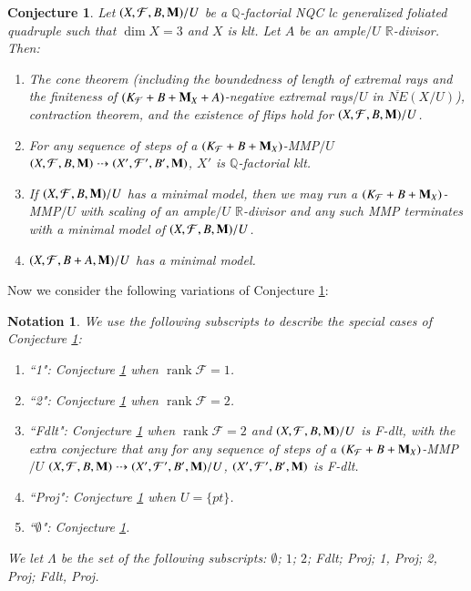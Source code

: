 \documentclass[preprint,12pt]{elsarticle}
\newcommand{\Mm}{{\bf{M}}}
\newcommand{\Qq}{\mathbb{Q}}
\newcommand{\Rr}{\mathbb{R}}
\newcommand{\rk}{\operatorname{rank}}
\newcommand{\Ff}{\mathcal{F}}
\newtheorem{conj}[thm]{Conjecture}
\newtheorem{nota}[thm]{Notation}
\begin{document}
\begin{conj}\label{conj: mmp gfq threefold}
    Let $(X,\Ff,B,\Mm)/U$ be a $\Qq$-factorial NQC lc generalized foliated quadruple such that $\dim X=3$ and $X$ is klt. Let $A$ be an ample$/U$ $\Rr$-divisor. Then:
    \begin{enumerate}
    \item The cone theorem (including the boundedness of length of extremal rays and the finiteness of $(K_{\Ff}+B+\Mm_X+A)$-negative extremal rays$/U$ in $\overline{NE}(X/U)$), contraction theorem, and the existence of flips hold for $(X,\Ff,B,\Mm)/U$.
        \item For any sequence of steps of a $(K_{\Ff}+B+\Mm_X)$-MMP$/U$ $(X,\Ff,B,\Mm)\dashrightarrow (X',\Ff',B',\Mm)$, $X'$ is $\Qq$-factorial klt. 
        \item If $(X,\Ff,B,\Mm)/U$ has a minimal model, then we may run a $(K_{\Ff}+B+\Mm_X)$-MMP$/U$ with scaling of an ample$/U$ $\Rr$-divisor and any such MMP terminates with a minimal model of $(X,\Ff,B,\Mm)/U$.
        \item $(X,\Ff,B+A,\Mm)/U$ has a minimal model.
    \end{enumerate}
\end{conj}

Now we consider the following variations of Conjecture \ref{conj: mmp gfq threefold}:

\begin{nota}\label{nota: special conjecture}
    We use the following subscripts to describe the special cases of Conjecture \ref{conj: mmp gfq threefold}:
    \begin{enumerate}
        \item ``1": Conjecture \ref{conj: mmp gfq threefold} when $\rk\Ff=1$.
        \item ``2": Conjecture \ref{conj: mmp gfq threefold} when $\rk\Ff=2$.
        \item ``Fdlt": Conjecture \ref{conj: mmp gfq threefold} when $\rk\Ff=2$ and $(X,\Ff,B,\Mm)/U$ is F-dlt, with the extra conjecture that any for any sequence of steps of a $(K_{\Ff}+B+\Mm_X)$-MMP$/U$ $(X,\Ff,B,\Mm)\dashrightarrow (X',\Ff',B',\Mm)/U$, $(X',\Ff',B',\Mm)$ is F-dlt.
        \item ``Proj": Conjecture \ref{conj: mmp gfq threefold} when $U=\{pt\}$.
        \item ``$\emptyset$": Conjecture \ref{conj: mmp gfq threefold}.
    \end{enumerate}
    We let $\Lambda$ be the set of the following subscripts: $\emptyset$; $1$; $2$; Fdlt; Proj; 1, Proj; 2, Proj; Fdlt, Proj.
\end{nota}
\end{document}
